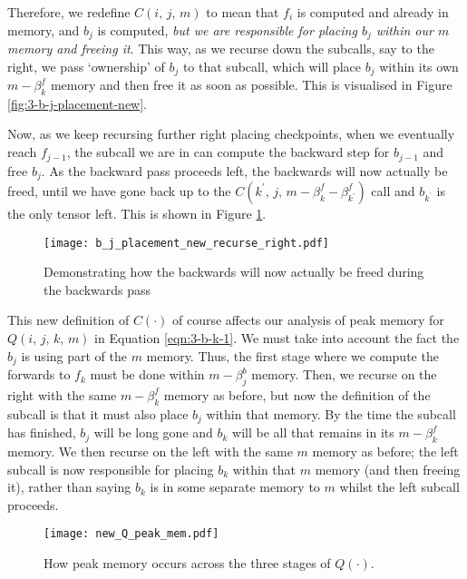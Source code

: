 Therefore, we redefine \(C(i,\,j,\,m)\) to mean that \(f_i\) is computed and already in memory, and \(b_j\) is computed, \textit{but we are responsible for placing \(b_j\) within our \(m\) memory and freeing it}.
This way, as we recurse down the subcalls, say to the right, we pass `ownership' of \(b_j\) to that subcall, which will place \(b_j\) within its own \(m-\beta^f_k\) memory and then free it as soon as possible.
This is visualised in Figure \ref{fig:3-b-j-placement-new}.

Now, as we keep recursing further right placing checkpoints, when we eventually reach \(f_{j-1}\), the subcall we are in can compute the backward step for \(b_{j-1}\) and free \(b_j\).
As the backward pass proceeds left, the backwards will now actually be freed, until we have gone back up to the \(C(k^\prime,\, j,\, m-\beta^f_k -\beta^f_{k^\prime})\) call and \(b_{k^\prime}\) is the only tensor left.
This is shown in Figure \ref{fig:3-b-j-placement-new-right}.
\begin{figure}[h]
    \centering
    \texttt{[image: b\_j\_placement\_new\_recurse\_right.pdf]}
    \caption{Demonstrating how the backwards will now actually be freed during the backwards pass}
    \label{fig:3-b-j-placement-new-right}
\end{figure}

This new definition of \(C(\cdot)\) of course affects our analysis of peak memory
for \(Q(i,\,j,\,k,\,m)\) in Equation \ref{eqn:3-b-k-1}.
We must take into account the fact the \(b_j\) is using part of the \(m\) memory.
Thus, the first stage where we compute the forwards to \(f_k\) must be done within \(m-\beta^b_j\) memory.
Then, we recurse on the right with the same \(m-\beta^f_k\) memory as before, but now the definition of the subcall is that it must also place \(b_j\) within that memory.
By the time the subcall has finished, \(b_j\) will be long gone and \(b_k\) will be all that remains in its \(m-\beta^f_k\) memory.
We then recurse on the left with the same \(m\) memory as before;
the left subcall is now responsible for placing \(b_k\) within that \(m\) memory (and then freeing it), rather than saying \(b_k\) is in some separate memory to \(m\) whilst the left subcall proceeds.
\begin{figure}[h]
    \centering
    \texttt{[image: new\_Q\_peak\_mem.pdf]}
    \caption{How peak memory occurs across the three stages of \(Q(\cdot)\).}
    \label{fig:3-new-Q-peak-mem}
\end{figure}

